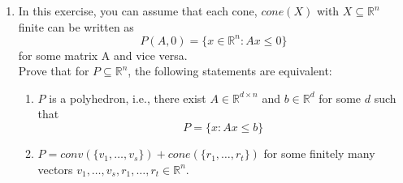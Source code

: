 \documentclass[11pt,a4paper]{article}
\renewcommand{\leq}{\leqslant}
\begin{document}
\begin{enumerate}
\item In this exercise, you can assume that each cone, $cone(X)$ with $X ⊆ \mathbb{R}^n$ finite can be written as $$P(A,0)=\{x∈\mathbb{R}^n: Ax\leq 0\}$$ for some matrix A and vice versa. \\
Prove that for $P ⊆ \mathbb{R}^n$, the following statements are equivalent:
\begin{enumerate}
    \item $P$ is a polyhedron, i.e., there exist $A ∈ \mathbb{R}^{d×n}$ and $b ∈ \mathbb{R}^d$ for some $d$ such that
$$P =\{x:Ax\leq b\}$$
\item $P =conv(\{v_1,\hdots,v_s\})+cone(\{r_1,\hdots,r_t\})$ for some finitely many vectors $v_1, \hdots, v_s, r_1, \hdots, r_t \in \mathbb{R}^n$. 
\end{enumerate}


\end{enumerate}


%
%


 
\end{document}
